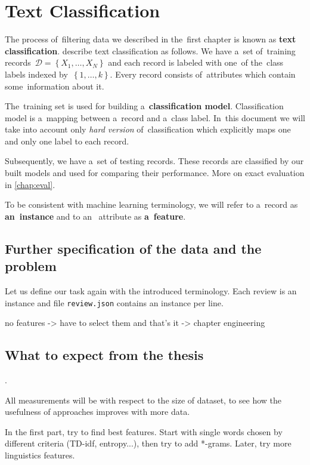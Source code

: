 \chapter{Text Classification}

The process of~filtering data we described in the~first chapter is known as {\bf text classification}.
\citet{AggZhai12} describe text classification as follows.
We have a~set of~training records~$\mathcal{D} = \left\{X_1, \ldots, X_N\right\}$ and each record is labeled with one~of the~class labels indexed by~$\left\{1,\ldots, k\right\}$.
Every record consists of~attributes which contain some~information about it.

The~training set is used for building a~{\bf classification model}. Classification model is a~mapping between a~record and a~class label.
In~this document we will take into account only \emph{hard version} of~classification which explicitly maps one and only one label to each record.  


Subsequently, we have a~set of testing records.
These records are classified by our built models and used for comparing their performance.
More on exact evaluation in \autoref{chap:eval}.

To be consistent with machine learning terminology, we will refer to a~record as {\bf an~instance} and to an~ attribute as {\bf a~feature}.

\section{Further specification of the data and the problem}

Let us define our task again with the introduced terminology. Each review is an instance and file \texttt{review.json} contains an instance per line. 

no features -> have to select them and that's it -> chapter engineering



\section{What to expect from the thesis}

.

All measurements will be with respect to the size of dataset, to see how the usefulness of approaches improves with more data.

In the first part, try to find best features. Start with single words chosen by different
criteria (TD-idf, entropy...), then try to add *-grams. Later, try more linguistics features.

